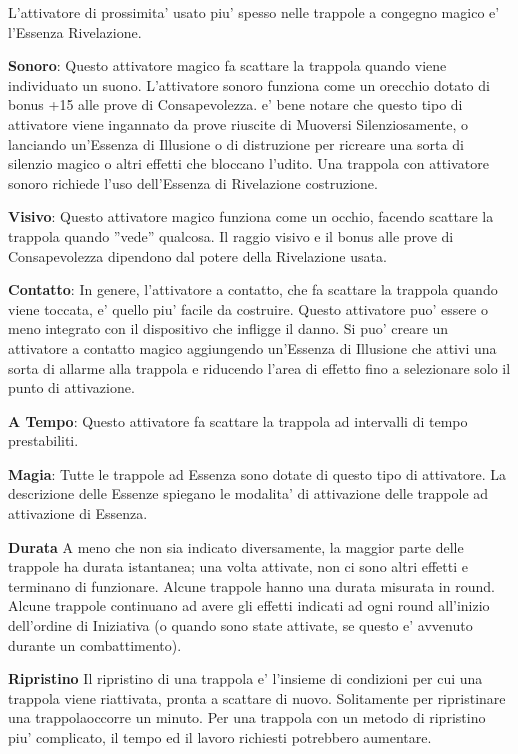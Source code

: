 \documentclass[a4paper,11pt,twoside,openany]{book}
\begin{document}
{L'attivatore di prossimita' usato piu' spesso nelle trappole a congegno magico e' l'Essenza Rivelazione.

\textbf{Sonoro}: Questo attivatore magico fa scattare la trappola quando viene individuato un suono. L'attivatore sonoro funziona come un orecchio dotato di bonus +15 alle prove di Consapevolezza. e' bene notare che questo tipo di attivatore viene ingannato da prove riuscite di Muoversi Silenziosamente, o lanciando un'Essenza di Illusione o di distruzione per ricreare una sorta di silenzio magico o altri effetti che bloccano l'udito. Una trappola con attivatore sonoro richiede l'uso dell'Essenza di Rivelazione costruzione.

\textbf{Visivo}: Questo attivatore magico funziona come un occhio, facendo scattare la trappola quando ''vede'' qualcosa. Il raggio visivo e il bonus alle prove di Consapevolezza dipendono dal potere della Rivelazione usata.

\textbf{Contatto}: In genere, l'attivatore a contatto, che fa scattare la trappola quando viene toccata, e' quello piu' facile da costruire. Questo attivatore puo' essere o meno integrato con il dispositivo che infligge il danno. Si puo' creare un attivatore a contatto magico aggiungendo un'Essenza di Illusione che attivi una sorta di allarme alla trappola e riducendo l'area di effetto fino a selezionare solo il punto di attivazione.

\textbf{A Tempo}: Questo attivatore fa scattare la trappola ad intervalli di tempo prestabiliti.

\textbf{Magia}: Tutte le trappole ad Essenza sono dotate di questo tipo di attivatore. La descrizione delle Essenze spiegano le modalita' di attivazione delle trappole ad attivazione di Essenza. 

\textbf{Durata}
A meno che non sia indicato diversamente, la maggior parte delle trappole ha durata istantanea; una volta attivate, non ci sono altri effetti e terminano di funzionare. Alcune trappole hanno una durata misurata in round. Alcune trappole continuano ad avere gli effetti indicati ad ogni round all'inizio dell'ordine di Iniziativa (o quando sono state attivate, se questo e' avvenuto durante un combattimento).

\textbf{Ripristino}
Il ripristino di una trappola e' l'insieme di condizioni per cui una trappola viene riattivata, pronta a scattare di nuovo. Solitamente per ripristinare una trappolaoccorre un minuto. Per una trappola con un metodo di ripristino piu' complicato, il tempo ed il lavoro richiesti potrebbero aumentare.

}
\end{document}
